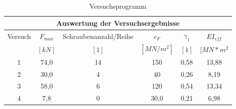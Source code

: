 \begin{table}[h]
\caption{Versuchsprogramm}
\begin{center}
\begin{tabular}{|c|c|c|c|c|c|}
\hline 
\multicolumn{6}{|c|}{ Auswertung der Versuchsergebnisse} \\ 
\hline 
Versuch & $F_{max} $ & Schraubenanzahl/Reihe & $c_{F}$ & $\gamma_{1}$ &$EI_{eff}$ \\ 

 & $[kN]$ & $[1]$ & $[MN/m^{2}]$ & $[1]$ &$[MN*m^{2}$ \\ 
\hline\hline
1 & 74,0 &14& 150 & 0,58 & 13,88 \\ 
\hline 
2  & 30,0 &4& 40 & 0,26 & 8,19 \\ 
\hline 
3 & 58,0 &6& 120 & 0,54 & 13,34 \\ 
\hline 
4  & 7,8 &0& 30,0 & 0,21 &   6,98 \\ 
\hline 
\end{tabular} 
\end{center}
\label{tab:Versuchsprogramm}
\end{table}

